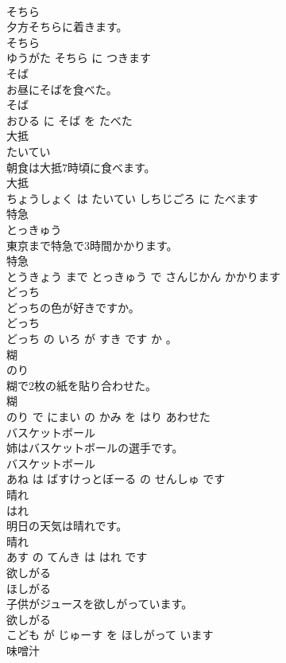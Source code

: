 \documentclass[8pt]{extreport}
\begin{document}
\begin{CJK}{UTF8}{min}
\\	そちら	
\\	夕方そちらに着きます。	
\\	そちら 
\\	ゆうがた そちら に つきます			
\\	そば	
\\	お昼にそばを食べた。	
\\	そば 
\\	おひる に そば を たべた			
\\	大抵	
\\	たいてい			
\\	朝食は大抵7時頃に食べます。	
\\	大抵 
\\	ちょうしょく は たいてい しちじごろ に たべます			
\\	特急	
\\	とっきゅう			
\\	東京まで特急で3時間かかります。	
\\	特急 
\\	とうきょう まで とっきゅう で さんじかん かかります			
\\	どっち	
\\	どっちの色が好きですか。	
\\	どっち 
\\	どっち の いろ が すき です か 。			
\\	糊	
\\	のり			
\\	糊で2枚の紙を貼り合わせた。	
\\	糊 
\\	のり で にまい の かみ を はり あわせた			
\\	バスケットボール	
\\	姉はバスケットボールの選手です。	
\\	バスケットボール 
\\	あね は ばすけっとぼーる の せんしゅ です			
\\	晴れ	
\\	はれ			
\\	明日の天気は晴れです。	
\\	晴れ 
\\	あす の てんき は はれ です			
\\	欲しがる	
\\	ほしがる			
\\	子供がジュースを欲しがっています。	
\\	欲しがる 
\\	こども が じゅーす を ほしがって います			
\\	味噌汁	

\end{CJK}
\end{document}

